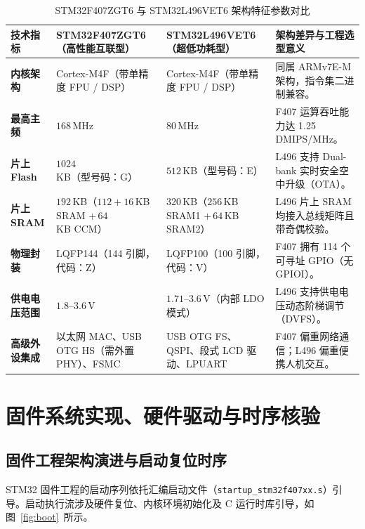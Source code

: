 \documentclass[11pt,a4paper]{ctexart}
\begin{document}
\begin{table}[H]
\centering
\caption{STM32F407ZGT6 与 STM32L496VET6 架构特征参数对比}
\label{tab:compare}
\begingroup\small
\begin{tabularx}{\textwidth}{@{}>{\bfseries}p{2.6cm} p{3.9cm} p{3.9cm} Y@{}}
\toprule
{}
\normalfont\bfseries 技术指标 & \bfseries STM32F407ZGT6（高性能互联型） & \bfseries STM32L496VET6（超低功耗型） & \bfseries 架构差异与工程选型意义 \\
\midrule
内核架构 & Cortex-M4F（带单精度 FPU / DSP） & Cortex-M4F（带单精度 FPU / DSP） & 同属 ARMv7E-M 架构，指令集二进制兼容。 \\
最高主频 & $168\,$MHz & $80\,$MHz & F407 运算吞吐能力达 1.25 DMIPS/MHz。 \\
片上 Flash & $1024\,$KB（型号码：G） & $512\,$KB（型号码：E） & L496 支持 Dual-bank 实时安全空中升级（OTA）。 \\
片上 SRAM & $192\,$KB（$112+16\,$KB SRAM $+\,64\,$KB CCM） & $320\,$KB（$256\,$KB SRAM1 $+\,64\,$KB SRAM2） & L496 片上 SRAM 均接入总线矩阵且带奇偶校验。 \\
物理封装 & LQFP144（144 引脚，代码：Z） & LQFP100（100 引脚，代码：V） & F407 拥有 114 个可寻址 GPIO（无 GPIOI）。 \\
供电电压范围 & $1.8$--$3.6\,$V & $1.71$--$3.6\,$V（内部 LDO 模式） & L496 支持供电电压动态阶梯调节（DVFS）。 \\
高级外设集成 & 以太网 MAC、USB OTG HS（需外置 PHY）、FSMC & USB OTG FS、QSPI、段式 LCD 驱动、LPUART & F407 偏重网络通信；L496 偏重便携人机交互。 \\
\bottomrule
\end{tabularx}
\endgroup
\end{table}

\section{固件系统实现、硬件驱动与时序核验}

\subsection{固件工程架构演进与启动复位时序}
STM32 固件工程的启动序列依托汇编启动文件（\texttt{startup\_stm32f407xx.s}）引导。启动执行流涉及硬件复位、内核环境初始化及 C 运行时库引导，如图~\ref{fig:boot}~所示。
\end{document}
